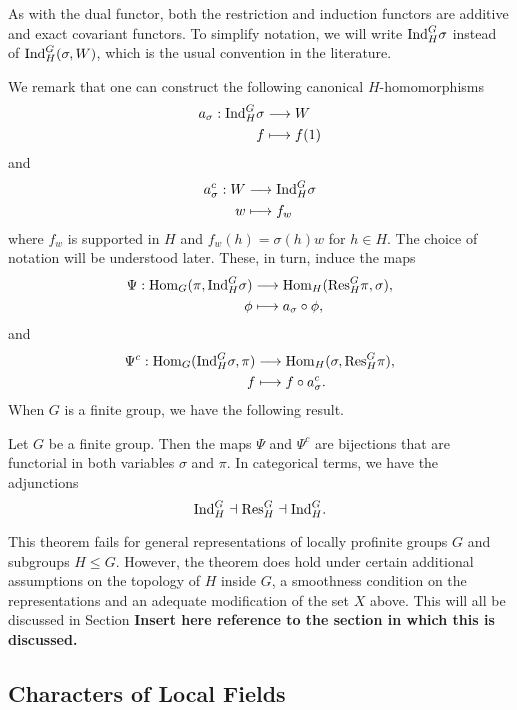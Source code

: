 As with the dual functor, both the restriction and induction functors are additive and exact covariant functors. To simplify notation, we will write $\mathrm{Ind}_H^G\sigma$ instead of $\mathrm{Ind}_H^G(\sigma,W)$, which is the usual convention in the literature.

We remark that one can construct the following canonical $H$-homomorphisms 
\begin{align*}
    a_\sigma: \mathrm{Ind}_H^G\sigma&\longrightarrow W\\
    f&\longmapsto f(1)
\end{align*}
and 
\begin{align*}
    a_\sigma^c: W&\longrightarrow \mathrm{Ind}_H^G\sigma\\
    w&\longmapsto f_w
\end{align*}
where $f_w$ is supported in $H$ and $f_w(h)=\sigma(h)w$ for $h\in H$. The choice of notation will be understood later. These, in turn, induce the maps 
\begin{align*}
    \Psi:\mathrm{Hom}_G(\pi,\mathrm{Ind}_H^G\sigma)&\longrightarrow\mathrm{Hom}_H(\mathrm{Res}_H^G\pi,\sigma),\\
    \phi&\longmapsto a_\sigma\circ\phi,
\end{align*}
and
\begin{align*}
    \Psi^c:\mathrm{Hom}_G(\mathrm{Ind}_H^G\sigma,\pi)&\longrightarrow\mathrm{Hom}_H(\sigma,\mathrm{Res}_H^G\pi),\\
    f&\longmapsto f\circ a_\sigma^c.
\end{align*}
When $G$ is a finite group, we have the following result.
\begin{thm}
    Let $G$ be a finite group. Then the maps $\Psi$ and $\Psi^c$ are bijections that are functorial in both variables $\sigma$ and $\pi$. In categorical terms, we have the adjunctions $$\mathrm{Ind}_H^G\dashv\mathrm{Res}_H^G\dashv\mathrm{Ind}_H^G.$$
\end{thm}

This theorem fails for general representations of locally profinite groups $G$ and subgroups $H\leq G$. However, the theorem does hold under certain additional assumptions on the topology of $H$ inside $G$, a smoothness condition on the representations and an adequate modification of the set $X$ above. This will all be discussed in Section \textbf{Insert here reference to the section in which this is discussed.}


\subsection{Characters of Local Fields}

